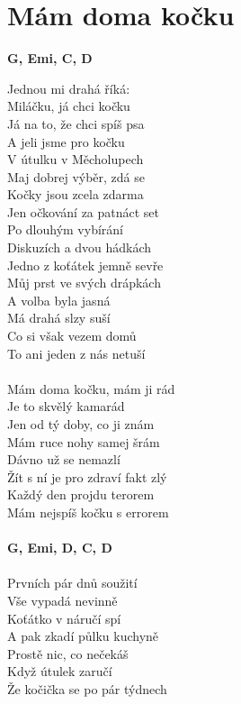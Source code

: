 \section{Mám doma kočku}
\footnotesize\textbf{G, Emi, C, D}\\
\normalsize
\begin{multicols}{2}
Jednou mi drahá říká:\\
Miláčku, já chci kočku\\
Já na to, že chci spíš psa\\
A jeli jsme pro kočku\\
V útulku v Měcholupech\\
Maj dobrej výběr, zdá se\\
Kočky jsou zcela zdarma\\
Jen očkování za patnáct set\\
Po dlouhým vybírání\\
Diskuzích a dvou hádkách\\
Jedno z koťátek jemně sevře\\
Můj prst ve svých drápkách\\
A volba byla jasná\\
Má drahá slzy suší\\
Co si však vezem domů\\
To ani jeden z nás netuší\\
\\
Mám doma kočku, mám ji rád\\
Je to skvělý kamarád\\
Jen od tý doby, co ji znám\\
Mám ruce nohy samej šrám\\
Dávno už se nemazlí\\
Žít s ní je pro zdraví fakt zlý\\
Každý den projdu terorem\\
Mám nejspíš kočku s errorem\\
\\
\footnotesize\textbf{G, Emi, D, C, D}\\
\normalsize
\\
Prvních pár dnů soužití\\
Vše vypadá nevinně\\
Koťátko v náručí spí\\
A pak zkadí půlku kuchyně\\
Prostě nic, co nečekáš\\
Když útulek zaručí\\
Že kočička se po pár týdnech\\

\end{multicols}
